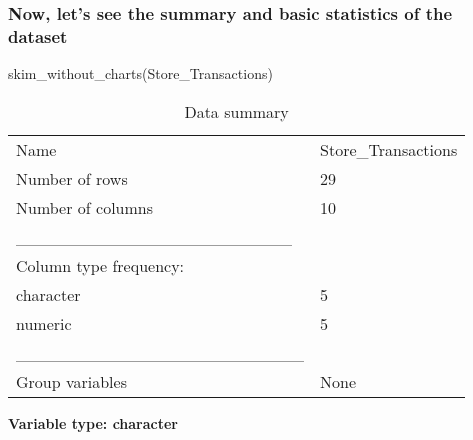 \documentclass[
]{article}
\newenvironment{Shaded}{\begin{snugshade}}{\end{snugshade}}
\newcommand{\FunctionTok}[1]{\textcolor[rgb]{0.00,0.00,0.00}{#1}}
\newcommand{\NormalTok}[1]{#1}
\begin{document}
\hypertarget{now-lets-see-the-summary-and-basic-statistics-of-the-dataset}{%
\subsubsection{Now, let's see the summary and basic statistics of the
dataset}\label{now-lets-see-the-summary-and-basic-statistics-of-the-dataset}}

\begin{Shaded}
\begin{Highlighting}[]
\FunctionTok{skim\_without\_charts}\NormalTok{(Store\_Transactions)}
\end{Highlighting}
\end{Shaded}

\begin{longtable}[]{@{}ll@{}}
\caption{Data summary}\tabularnewline
\toprule()
\endhead
Name & Store\_Transactions \\
Number of rows & 29 \\
Number of columns & 10 \\
\_\_\_\_\_\_\_\_\_\_\_\_\_\_\_\_\_\_\_\_\_\_\_ & \\
Column type frequency: & \\
character & 5 \\
numeric & 5 \\
\_\_\_\_\_\_\_\_\_\_\_\_\_\_\_\_\_\_\_\_\_\_\_\_ & \\
Group variables & None \\
\bottomrule()
\end{longtable}

\textbf{Variable type: character}
\end{document}
